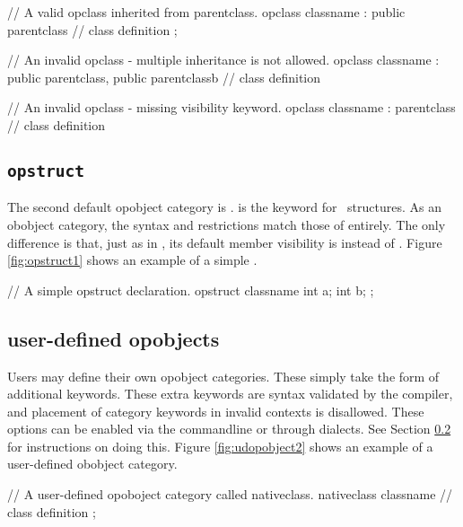 \begin{opcpp}[label={fig:opclass2},caption={Examples of valid and invalid \opcppK{opclass} inheritance.}]
// A valid opclass inherited from parentclass.
opclass classname : public parentclass
{
	// class definition
};

// An invalid opclass - multiple inheritance is not allowed.
opclass classname : public parentclass, public parentclassb
{
	// class definition
}

// An invalid opclass - missing visibility keyword.
opclass classname : parentclass
{
	// class definition
}
\end{opcpp}

\subsection{{\tt opstruct}}

The second default opobject category is .   is the keyword for \opCPP\ structures.  As an obobject category, the syntax and restrictions match those of  entirely.  The only difference is that, just as in \cpp, its default member visibility is  instead of .  Figure \ref{fig:opstruct1} shows an example of a simple .

\begin{opcpp}[label={fig:opstruct1},caption={A simple \opcppK{opstruct} declaration in \opCPP.}]
// A simple opstruct declaration.
opstruct classname
{
	int a;
	int b;
};

\end{opcpp}

\subsection{user-defined opobjects}

Users may define their own opobject categories.  These simply take the form of additional keywords.  These extra keywords are syntax validated by the compiler, and placement of category keywords in invalid contexts is disallowed.  These options can be enabled via the commandline or through dialects.  See Section \ref{} for instructions on doing this.  Figure \ref{fig:udopobject2} shows an example of a user-defined obobject category.

\begin{opcpp}[label={fig:udopobject2},caption={A user-defined opobject category declaration called \opcppK{nativeclass}.}]
// A user-defined opoboject category called nativeclass.
nativeclass classname
{
	// class definition
};
\end{opcpp}

